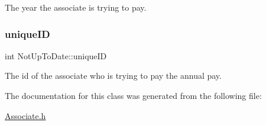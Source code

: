 The year the associate is trying to pay. 

\mbox{\label{classNotUpToDate_afa612d29a846c1e7b679fbb069035a72}} 
\subsubsection{\texorpdfstring{unique\+ID}{uniqueID}}
{\footnotesize\ttfamily int Not\+Up\+To\+Date\+::unique\+ID\hspace{0.3cm}{\ttfamily [private]}}



The id of the associate who is trying to pay the annual pay. 



The documentation for this class was generated from the following file\+:\begin{DoxyCompactItemize}
\item 
\mbox{\hyperlink{Associate_8h}{Associate.\+h}}\end{DoxyCompactItemize}
